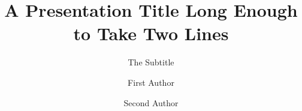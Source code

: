 \documentclass{beamer}
\title{A Presentation Title Long Enough to Take Two Lines}
\subtitle{The Subtitle}
\author{First Author \and Second Author}
\institute{Some Institute}
\begin{document}
\begin{frame}
\titlepage
\end{frame}
\end{document}
